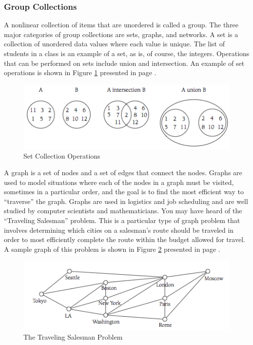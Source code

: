\documentclass[12pt,a4paper,final,twoside,titlepage]{book}
\begin{document}
\subsubsection{Group Collections}
A nonlinear collection of items that are unordered is called a group. The three major categories of group collections are sets, graphs, and networks. A set is a collection of unordered data values where each value is unique. The list of students in a class is an example of a set, as is, of course, the integers. Operations that can be performed on sets include union and intersection. An example of set operations is shown in Figure \ref{SetCollectionOperations} presented in page \pageref{SetCollectionOperations}.
\begin{figure}
\begin{center}
\includegraphics[scale=0.75]{SetCollectionOperations}
\end{center}
\caption{Set Collection Operations}
\label{SetCollectionOperations}
\end{figure}
A graph is a set of nodes and a set of edges that connect the nodes. Graphs are used to model situations where each of the nodes in a graph must be visited, sometimes in a particular order, and the goal is to find the most efficient way to “traverse” the graph. Graphs are used in logistics and job scheduling and are well studied by computer scientists and mathematicians. You may have heard of the “Traveling Salesman” problem. This is a particular type of graph problem that involves determining which cities on a salesman’s route should be traveled in order to most efficiently complete the route within the budget allowed for travel. A sample graph of this problem is shown in Figure \ref{TravelingSalesmanProblem} presented in page \pageref{TravelingSalesmanProblem}.
\begin{figure}
\begin{center}
\includegraphics[scale=0.75]{TravelingSalesmanProblem}
\end{center}
\caption{The Traveling Salesman Problem}
\label{TravelingSalesmanProblem}
\end{figure}
\end{document}
